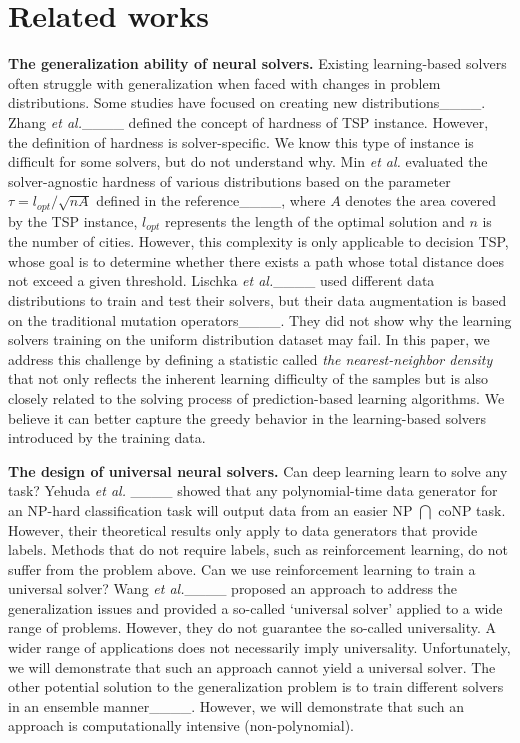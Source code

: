 \section{Related works}
\textbf{The generalization ability of neural solvers.} Existing learning-based solvers often struggle with generalization when faced with changes in problem distributions. Some studies have focused on creating new distributions____. Zhang \emph{et al.}____ defined the concept of hardness of TSP instance. However, the definition of hardness is solver-specific. We know this type of instance is difficult for some solvers, but do not understand why. Min \emph{et al.} evaluated the solver-agnostic hardness of various distributions based on the parameter $\tau=l_{opt}/\sqrt{nA}$ defined in the reference____, where $A$ denotes the area covered by the TSP instance, $l_{opt}$ represents the length of the optimal solution and $n$ is the number of cities. However, this complexity is only applicable to decision TSP, whose goal is to determine whether there exists a path whose total distance does not exceed a given threshold. Lischka \emph{et al.}____ used different data distributions to train and test their solvers, but their data augmentation is based on the traditional mutation operators____. They did not show why the learning solvers training on the uniform distribution dataset may fail. In this paper, we address this challenge by defining a statistic called \emph{the nearest-neighbor density} that not only reflects the inherent learning difficulty of the samples but is also closely related to the solving process of prediction-based learning algorithms. We believe it can better capture the greedy behavior in the learning-based solvers introduced by the training data.

\textbf{The design of universal neural solvers.} Can deep learning learn to solve any task? Yehuda \emph{et al.} ____ showed that any polynomial-time data generator for an NP-hard classification task will output data from an easier NP $\bigcap$ coNP task. However, their theoretical results only apply to data generators that provide labels. Methods that do not require labels, such as reinforcement learning, do not suffer from the problem above. Can we use reinforcement learning to train a universal solver? Wang \emph{et al.}____ proposed an approach to address the generalization issues and provided a so-called `universal solver' applied to a wide range of problems. However, they do not guarantee the so-called universality. A wider range of applications does not necessarily imply universality. Unfortunately, we will demonstrate that such an approach cannot yield a universal solver. The other potential solution to the generalization problem is to train different solvers in an ensemble manner____. However, we will demonstrate that such an approach is computationally intensive (non-polynomial).